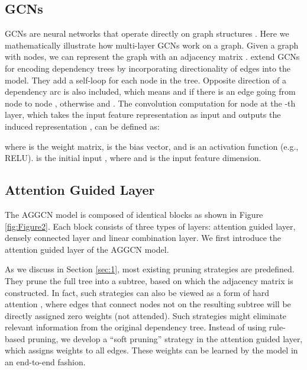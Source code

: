 \documentclass[11pt,a4paper]{article}
\begin{document}
\subsection{GCNs}
\label{ssec:2.1}

GCNs are neural networks that operate directly on graph structures \citep{Kipf2016SemiSupervisedCW}.  Here we mathematically illustrate how multi-layer GCNs work on a graph. Given a graph with  nodes, we can represent the graph with an  adjacency matrix . \citet{Marcheggiani2017EncodingSW} extend GCNs for encoding dependency trees by incorporating directionality of edges into the model. They add a self-loop for each node in the tree. Opposite direction of a dependency arc is also included, which means  and  if there is an edge going from node  to node , otherwise  and . The convolution computation for node  at the -th layer, which takes the input feature representation  as input and outputs the induced representation , can be defined as:

where  is the weight matrix,  is the bias vector,  and  is an activation function (e.g., RELU).  is the initial input , where  and  is the input feature dimension. 


\subsection{Attention Guided Layer}
\label{ssec:2.2}
The AGGCN model is composed of  identical blocks as shown in Figure \ref{fig:Figure2}. Each block consists of three types of layers: attention guided layer, densely connected layer and linear combination layer. We first introduce the attention guided layer of the AGGCN model.



As we discuss in Section \ref{sec:1}, most existing pruning strategies are predefined. They prune the full tree into a subtree, based on which the adjacency matrix is constructed. In fact, such strategies can also be viewed as a form of hard attention \citep{Xu2015ShowAA}, where edges that connect nodes not on the resulting subtree will be directly assigned zero weights (not attended). Such strategies might eliminate relevant information from the original dependency tree. Instead of using rule-based pruning, we develop a ``soft pruning'' strategy in the attention guided layer, which assigns weights to all edges. These weights can be learned by the model in an end-to-end fashion.
\end{document}
